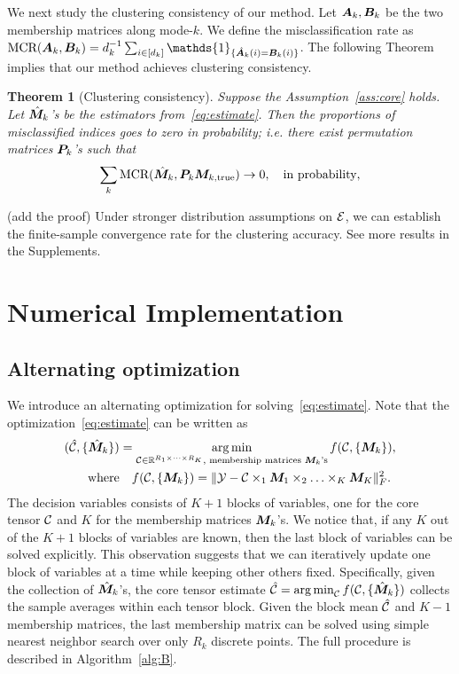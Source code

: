 \documentclass{article}
\newtheorem{theorem}{Theorem}
\begin{document}
We next study the clustering consistency of our method. Let $\bm A_k, \bm B_k$ be the two membership matrices along mode-$k$. We define the misclassification rate as $\text{MCR}(\mA_k,\mB_k)=d_k^{-1}\sum_{i\in[d_k]}\mathds{1}_{\{\hat \mA_k(i)=\mB_k(i)\}}$. The following Theorem implies that our method achieves clustering consistency. 

\begin{theorem}[Clustering consistency]\label{thm:partition}
Suppose the Assumption~\eqref{ass:core} holds. Let $\hat {\bm M}_k$'s be the estimators from~\eqref{eq:estimate}. Then the proportions of misclassified indices goes to zero in probability; i.e. there exist permutation matrices $\bm{P}_k$'s such that
\[
\sum_k \text{MCR}(\hat {\bm M}_k, \bm{P}_k\bm M_{k,\text{true}}) \rightarrow 0, \quad \text{in probability},
\]
\end{theorem}
(add the proof)
Under stronger distribution assumptions on $\mathcal{E}$, we can establish the finite-sample convergence rate for the clustering accuracy. See more results in the Supplements. 

\section{Numerical Implementation}
\subsection{Alternating optimization}
We introduce an alternating optimization for solving~\eqref{eq:estimate}. Note that the optimization~\eqref{eq:estimate} can be written as
\begin{align}\label{eq:op}
(\hat {\mathcal{C}}, \{\hat {\bm M}_k\})&=\operatorname*{arg\,min}_{\mathcal{C}\in\mathbb{R}^{R_1\times \cdots \times R_K}, \text{ membership matrices $\bm M_k$'s}} f(\mathcal{C},\{\bm M_k\}),\notag\\
 \text{where}&\quad f(\mathcal{C},\{\bm M_k\})=\lVert\mathcal{Y}-\mathcal{C}\times_1\bm M_1\times_2\ldots\times_K\bm M_K\rVert_F^2.\notag
\end{align}
The decision variables consists of $K+1$ blocks of variables, one for the core tensor $\mathcal{C}$ and $K$ for the membership matrices $\bm M_k$'s. We notice that, if any $K$ out of the $K+1$ blocks of variables are known, then the last block of variables can be solved explicitly. This observation suggests that we can iteratively update one block of variables at a time while keeping other others fixed. Specifically, given the collection of $\hat {\bm M}_k$'s, the core tensor estimate $\hat {\mathcal{C}}=\operatorname*{arg\,min}_{\mathcal{C}}f(\mathcal{C},\{\hat {\bm M}_k\})$ collects the sample averages within each tensor block. Given the block mean $\hat {\mathcal{C}}$ and $K-1$ membership matrices, the last membership matrix can be solved using simple nearest neighbor search over only $R_k$ discrete points. The full procedure is described in Algorithm~\ref{alg:B}.
\end{document}
